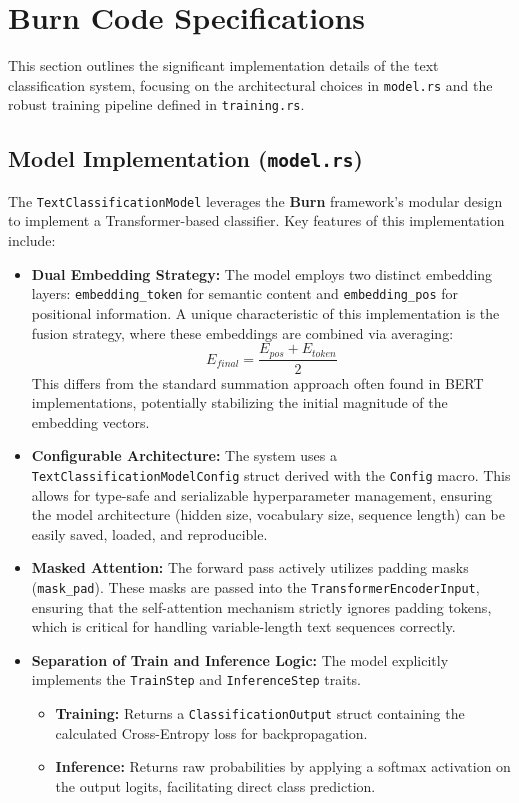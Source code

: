 \documentclass[11pt,a4paper]{article}
\begin{document}
\section{Burn Code Specifications}

This section outlines the significant implementation details of the text classification system, focusing on the architectural choices in \texttt{model.rs} and the robust training pipeline defined in \texttt{training.rs}.
\subsection{Model Implementation (\texttt{model.rs})}
The \texttt{TextClassificationModel} leverages the \textbf{Burn} framework's modular design to implement a Transformer-based classifier. Key features of this implementation include:
\begin{itemize}
    \item \textbf{Dual Embedding Strategy:} The model employs two distinct embedding layers: \texttt{embedding\_token} for semantic content and \texttt{embedding\_pos} for positional information. A unique characteristic of this implementation is the fusion strategy, where these embeddings are combined via averaging:
    \[
    E_{final} = \frac{E_{pos} + E_{token}}{2}
    \]
    This differs from the standard summation approach often found in BERT implementations, potentially stabilizing the initial magnitude of the embedding vectors.
    
    \item \textbf{Configurable Architecture:} The system uses a \texttt{TextClassificationModelConfig} struct derived with the \texttt{Config} macro. This allows for type-safe and serializable hyperparameter management, ensuring the model architecture (hidden size, vocabulary size, sequence length) can be easily saved, loaded, and reproducible.
    
    \item \textbf{Masked Attention:} The forward pass actively utilizes padding masks (\texttt{mask\_pad}). These masks are passed into the \texttt{TransformerEncoderInput}, ensuring that the self-attention mechanism strictly ignores padding tokens, which is critical for handling variable-length text sequences correctly.
    
    \item \textbf{Separation of Train and Inference Logic:} The model explicitly implements the \texttt{TrainStep} and \texttt{InferenceStep} traits. 
    \begin{itemize}
        \item \textbf{Training:} Returns a \texttt{ClassificationOutput} struct containing the calculated Cross-Entropy loss for backpropagation.
        \item \textbf{Inference:} Returns raw probabilities by applying a softmax activation on the output logits, facilitating direct class prediction.
    \end{itemize}
\end{itemize}
\end{document}
